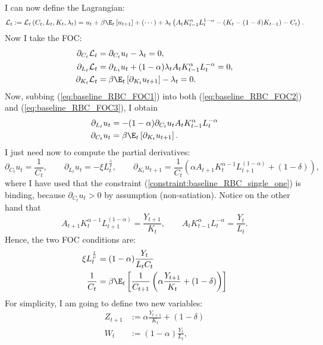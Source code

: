 \documentclass{article}
\begin{document}
	I can now define the Lagrangian:
	\begin{equation}
		\mathcal{L}_t := \mathcal{L}_t\left(C_t, L_t, K_t,\lambda_t\right) = u_t + \beta\E_t\left[u_{t+1}\right] + (\cdots) + \lambda_t\left( A_t K_{t-1}^\alpha L_t^{1-\alpha} - \left(K_t - (1-\delta) K_{t-1}\right) - C_t\right).
	\end{equation}
	Now I take the FOC:
	\begin{align}
		\partial_{C_t}\mathcal{L}_t &= \partial_{C_t} u_t - \lambda_t  = 0, \label{eq:baseline_RBC_FOC1}\\
		\partial_{L_t}\mathcal{L}_t &= \partial_{L_t} u_t  + (1-\alpha) \lambda_t A_t K_{t-1}^\alpha L_t^{-\alpha} = 0, \label{eq:baseline_RBC_FOC2}\\
		\partial_{K_t}\mathcal{L}_t &= \beta\E_t\left[\partial_{K_t} u_{t+1}\right] - \lambda_t = 0 \label{eq:baseline_RBC_FOC3}.
	\end{align}
	Now, subbing (\ref{eq:baseline_RBC_FOC1}) into both (\ref{eq:baseline_RBC_FOC2}) and (\ref{eq:baseline_RBC_FOC3}), I obtain
	\begin{align}
		\partial_{L_t} u_t &=  - (1-\alpha) \partial_{C_t} u_t A_t K_{t-1}^\alpha L_t^{-\alpha} \\
		\partial_{C_t} u_t &= \beta\E_t\left[\partial_{K_t} u_{t+1}\right].
	\end{align}
	I just need now to compute the partial derivatives:
	\begin{equation}
		\partial_{C_t} u_t = \frac{1}{C_t}, \quad\quad \partial_{L_t}u_{t} = -\xi L_t^{\frac{1}{\nu}}, \quad\quad \partial_{K_t} u_{t+1} = \frac{1}{C_t}\left(\alpha A_{t+1} K_{t}^{\alpha-1} L_{t+1}^{(1-\alpha)} + (1-\delta)\right),
	\end{equation}
	where I have used that the constraint (\ref{constraint:baseline_RBC_single_one}) is binding, because $\partial_{C_t} u_t > 0$ by assumption (non-satiation). Notice on the other hand that
	$$
		 A_{t+1} K_{t}^{\alpha-1} L_{t+1}^{(1-\alpha)}  = \frac{Y_{t+1}}{K_{t}}, \quad\quad A_t K_{t-1}^\alpha L_t^{-\alpha} = \frac{Y_t}{L_t}.
	$$
	Hence, the two FOC conditions are:
\begin{align}
	\xi L_t^{\frac{1}{\nu}} & =(1-\alpha)\frac{Y_t}{L_t C_t}\\
	\frac{1}{C_t} & = \beta\E_t\left[\frac{1}{C_{t+1}}\left(\alpha \frac{Y_{t+1}}{K_{t}} + (1-\delta)\right)\right]
\end{align}
For simplicity, I am going to define two new variables:
\begin{align}
		Z_{t+1} &:= \alpha \frac{Y_{t+1}}{K_t} + (1-\delta)\label{eq:baseline_RBC_Zt}\\
		W_{t} 	&:= (1-\alpha)\frac{Y_t}{L_t}, \label{eq:baseline_RBC_Wt}
	\end{align}
\end{document}
